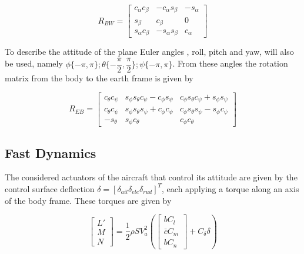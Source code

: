 \begin{equation}
R_{BW}=
\begin{bmatrix}
c_\alpha c_\beta & -c_\alpha s_\beta & -s_\alpha \\
s_\beta & c_\beta & 0 \\
s_\alpha c_\beta & -s_\alpha s_\beta & c_\alpha
\end{bmatrix}
\label{eq:wind2body}
\end{equation}

To describe the attitude of the plane Euler angles , roll, pitch and yaw, will also be used, namely $\phi\{-\pi,\pi\}; \theta \{-\dfrac{\pi}{2},\dfrac{\pi}{2}\}; \psi \{-\pi,\pi\}$. From these angles the rotation matrix from the body to the earth frame is given by

\begin{equation}
R_{EB}=
\begin{bmatrix}
c_\theta c_\psi & s_\phi s_\theta c_\psi - c_\phi s_\psi & c_\phi s_\theta c_\psi + s_\phi s_\psi \\
c_\theta c_\psi & s_\phi s_\theta s_\psi + c_\phi c_\psi & c_\phi s_\theta s_\psi - s_\phi c_\psi \\
-s_\theta & s_\phi c_\theta & c_\phi c_\theta
\end{bmatrix}
\label{eq:body2earth}
\end{equation}

\subsection{Fast Dynamics}
\label{section:background/model/fast_dynamics}

The considered actuators of the aircraft that control its attitude are given by the control surface deflection $\delta = [\delta_{ail} \delta_{ele} \delta_{rud}]^T$, each applying a torque along an axis of the body frame. These torques are given by

\begin{equation}
\begin{bmatrix}
L'\\
M\\
N
\end{bmatrix}
= \dfrac{1}{2}\rho S V_a^2\left(
\begin{bmatrix}
bC_l\\
\bar{c}C_m\\
bC_n
\end{bmatrix}
+ C_\delta \delta\right)
\label{eq:torque}
\end{equation}

